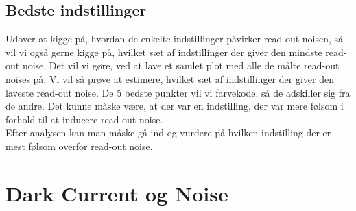 \documentclass[working]{tuftebook}
\begin{document}
\subsection{Bedste indstillinger}
Udover at kigge på, hvordan de enkelte indstillinger påvirker read-out noisen, så  vil vi også gerne kigge på, hvilket sæt af indstillinger der giver den mindste read-out noise. Det vil vi gøre, ved at lave et samlet plot med alle de målte read-out noises på. Vi vil så prøve at estimere, hvilket sæt af indstillinger der giver den laveste read-out noise. De 5 bedste punkter vil vi farvekode, så de adskiller sig fra de andre. Det kunne måske være, at der var en indstilling, der var mere følsom i forhold til at inducere read-out noise. 
\\
Efter analysen kan man måske gå ind og vurdere på hvilken indstilling der er mest følsom overfor read-out noise. 
\section{Dark Current og Noise}
\end{document}
